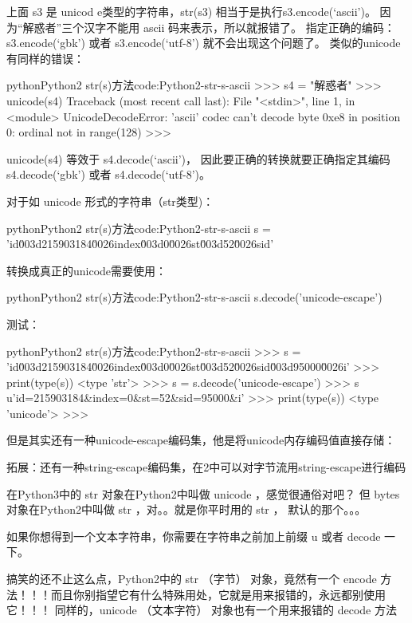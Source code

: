 上面 s3 是 unicod e类型的字符串，str(s3) 相当于是执行s3.encode(`ascii')。
因为“解惑者”三个汉字不能用 ascii 码来表示，所以就报错了。
指定正确的编码：s3.encode(`gbk') 或者 s3.encode(`utf-8') 就不会出现这个问题了。
类似的unicode有同样的错误：
\begin{jcode}{python}{Python2 str(s)方法}{code:Python2-str-s-ascii}
>>> s4 = "解惑者"
>>> unicode(s4)
Traceback (most recent call last):
  File "<stdin>", line 1, in <module>
UnicodeDecodeError: 'ascii' codec can't decode byte 0xe8 in position 0:
ordinal not in range(128)
>>>
\end{jcode}

unicode(s4) 等效于 s4.decode(`ascii')，
因此要正确的转换就要正确指定其编码 s4.decode(`gbk') 或者 s4.decode(`utf-8')。

对于如 unicode 形式的字符串（str类型)：

\begin{jcode}{python}{Python2 str(s)方法}{code:Python2-str-s-ascii}
s = 'id\u003d215903184\u0026index\u003d0\u0026st\u003d52\u0026sid’
\end{jcode}


转换成真正的unicode需要使用：

\begin{jcode}{python}{Python2 str(s)方法}{code:Python2-str-s-ascii}
s.decode('unicode-escape')
\end{jcode}

测试：

\begin{jcode}{python}{Python2 str(s)方法}{code:Python2-str-s-ascii}
>>> s = 'id\u003d215903184\u0026index\u003d0\u0026st\u003d52\u0026sid\u003d95000\u0026i'
>>> print(type(s))
<type 'str'>
>>> s = s.decode('unicode-escape')
>>> s
u'id=215903184&index=0&st=52&sid=95000&i'
>>> print(type(s))
<type 'unicode'>
>>>
\end{jcode}


但是其实还有一种unicode-escape编码集，他是将unicode内存编码值直接存储：

拓展：还有一种string-escape编码集，在2中可以对字节流用string-escape进行编码

在Python3中的 str 对象在Python2中叫做 unicode ，感觉很通俗对吧？
但 bytes 对象在Python2中叫做 str ，对。。就是你平时用的 str ， 默认的那个。。。

如果你想得到一个文本字符串，你需要在字符串之前加上前缀 u 或者 decode 一下。

搞笑的还不止这么点，Python2中的 str （字节） 对象，竟然有一个 encode 方法！！！而且你别指望它有什么特殊用处，它就是用来报错的，永远都别使用它！！！
同样的，unicode （文本字符） 对象也有一个用来报错的 decode 方法


